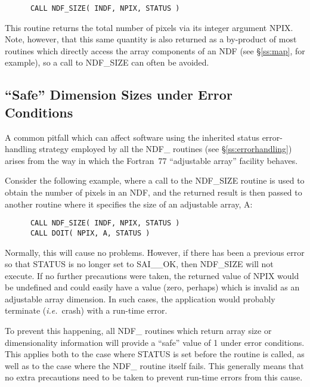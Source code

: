\documentclass[twoside,11pt]{article}
\newcommand{\htmlref}[2]{#1}
\newcommand{\xlabel}[1]{}
\newcommand{\st}[1]{{\em{#1}}}
\begin{document}
\small
\begin{verbatim}
      CALL NDF_SIZE( INDF, NPIX, STATUS )
\end{verbatim}
\normalsize

This routine returns the total number of pixels via its integer argument 
NPIX.
Note, however, that this same quantity is also returned as a by-product of most
routines which directly access the array components of an NDF (see
\S\ref{ss:map}, for example), so a call to NDF\_SIZE can often be avoided.

\subsection{\xlabel{safe_dimension_sizes_under_error_conditions}\label{ss:safedimensions}``Safe'' Dimension Sizes under Error Conditions}

A common pitfall which can affect software using the inherited status
error-handling strategy employed by all the NDF\_ routines (see
\S\ref{ss:errorhandling}) arises from the way in which the Fortran~77
``adjustable array'' facility behaves. 

Consider the following example, where a call to the \htmlref{NDF\_SIZE}{NDF_SIZE} routine is 
used to obtain the number of pixels in an NDF, and the returned result is 
then passed to another routine where it specifies the size of an adjustable 
array, A:

\small
\begin{verbatim}
      CALL NDF_SIZE( INDF, NPIX, STATUS )
      CALL DOIT( NPIX, A, STATUS )
\end{verbatim}
\normalsize

Normally, this will cause no problems.
However, if there has been a previous error so that STATUS is no longer set
to SAI\_\_OK, then NDF\_SIZE will not execute. 
If no further precautions were taken, the returned value of NPIX would be
undefined and could easily have a value (zero, perhaps) which is invalid as
an adjustable array dimension. 
In such cases, the application would probably terminate (\st{i.e.}\ crash)
with a run-time error. 

To prevent this happening, all NDF\_ routines which return array size or
dimensionality information will provide a ``safe'' value of 1 under error
conditions. 
This applies both to the case where STATUS is set before the routine is
called, as well as to the case where the NDF\_ routine itself fails.
This generally means that no extra precautions need to be taken to prevent 
run-time errors from this cause.
\end{document}
